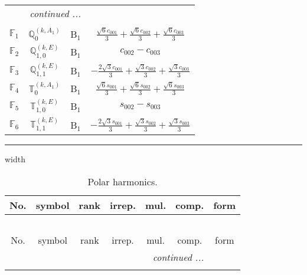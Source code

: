 \documentclass[fleqn,10pt,landscape]{article}
\begin{document}
\begin{itemize}
\begin{center}
\begin{longtable}{c|c|c|c}
 \hline \hline
\multicolumn{3}{r}{\footnotesize\it continued ...} \\ \endfoot

 \hline \hline
\multicolumn{3}{r}{} \\ \endlastfoot

$ \mathbb{F}_{1} $ & $\mathbb{Q}_{0}^{(k,A_{1})}$ & B$_{1}$ & $\frac{\sqrt{6} c_{001}}{3} + \frac{\sqrt{6} c_{002}}{3} + \frac{\sqrt{6} c_{003}}{3}$ \\
$ \mathbb{F}_{2} $ & $\mathbb{Q}_{1,0}^{(k,E)}$ & B$_{1}$ & $c_{002} - c_{003}$ \\
$ \mathbb{F}_{3} $ & $\mathbb{Q}_{1,1}^{(k,E)}$ & B$_{1}$ & $- \frac{2 \sqrt{3} c_{001}}{3} + \frac{\sqrt{3} c_{002}}{3} + \frac{\sqrt{3} c_{003}}{3}$ \\
$ \mathbb{F}_{4} $ & $\mathbb{T}_{0}^{(k,A_{1})}$ & B$_{1}$ & $\frac{\sqrt{6} s_{001}}{3} + \frac{\sqrt{6} s_{002}}{3} + \frac{\sqrt{6} s_{003}}{3}$ \\
$ \mathbb{F}_{5} $ & $\mathbb{T}_{1,0}^{(k,E)}$ & B$_{1}$ & $s_{002} - s_{003}$ \\
$ \mathbb{F}_{6} $ & $\mathbb{T}_{1,1}^{(k,E)}$ & B$_{1}$ & $- \frac{2 \sqrt{3} s_{001}}{3} + \frac{\sqrt{3} s_{002}}{3} + \frac{\sqrt{3} s_{003}}{3}$ \\
\end{longtable}
\end{center}

 \hfil \hrule height 1mm width \textwidth \hfil

\begin{center}
\renewcommand{\arraystretch}{1.3}
\begin{longtable}{ccccccc}
\caption{Polar harmonics.}
 \\
 \hline \hline
No. & symbol & rank & irrep. & mul. & comp. & form \\ \hline \endfirsthead

\multicolumn{6}{l}{\tablename\ \thetable{}} \\
 \hline \hline
No. & symbol & rank & irrep. & mul. & comp. & form \\ \hline \endhead

 \hline \hline
\multicolumn{6}{r}{\footnotesize\it continued ...} \\ \endfoot


\end{longtable}
\end{center}
\end{itemize}
\end{document}
